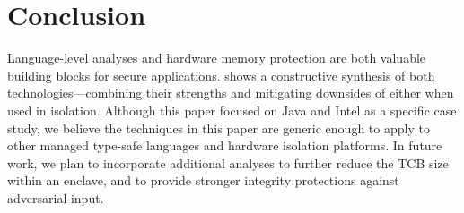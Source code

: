 \section{Conclusion}
\label{sec:conclusion}

Language-level analyses and hardware memory protection are both valuable
building blocks for secure applications.
\sysname{} shows a constructive synthesis of both technologies---combining their strengths
and mitigating downsides of either when used in isolation.
Although this paper focused on Java and Intel \sgx{} as a specific case study,
we believe the techniques in this paper are generic enough to apply to
other managed type-safe languages and hardware isolation platforms.
In future work, we plan to incorporate additional analyses
to further reduce the TCB size within an enclave, and to provide
stronger integrity protections against adversarial input.


